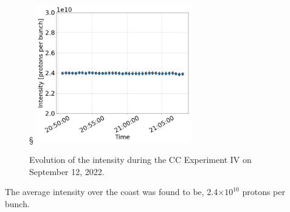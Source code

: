 \begin{figure}[h]
    \centering         §
    \includegraphics[width=0.6\textwidth]{images/app_e/intensity_cc_md_12Sep22_coast_12.png}
        \caption{Evolution of the intensity during the CC Experiment IV on September 12, 2022.}
        \label{fig:bunch_length_exp4}
 \end{figure}
 


The average intensity over the coast was found to be, 2.4$\times 10^{10}$ protons per bunch. 
